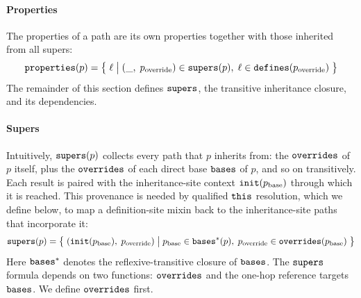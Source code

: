 \paragraph{Properties}
The properties of a path are its own properties together with
those inherited from all supers:
\begin{equation}\label{eq:properties}
  \mathtt{properties}(p) =
  \bigl\{\; \ell \;\big|\;
    (\_,\; p_{\mathrm{override}}) \in \mathtt{supers}(p),\;
    \ell \in \mathtt{defines}(p_{\mathrm{override}})
  \;\bigr\}
\end{equation}
The remainder of this section defines $\mathtt{supers}$,
the transitive inheritance closure,
and its dependencies.

\paragraph{Supers}
Intuitively, $\mathtt{supers}(p)$ collects every path that $p$ inherits from:
the $\mathtt{overrides}$ of $p$ itself,
plus the $\mathtt{overrides}$ of each
direct base $\mathtt{bases}$ of $p$, and so on transitively.
Each result is paired with the inheritance-site context
$\mathtt{init}(p_{\mathrm{base}})$ through which it is reached.
This provenance is needed by qualified $\mathtt{this}$ resolution,
which we define below, to map a definition-site mixin back to
the inheritance-site paths that incorporate it:
\begin{equation}\label{eq:supers}
  \mathtt{supers}(p) =
  \bigl\{\; (\mathtt{init}(p_{\mathrm{base}}),\; p_{\mathrm{override}}) \;\big|\;
    p_{\mathrm{base}} \in \mathtt{bases}^*(p),\;
    p_{\mathrm{override}} \in \mathtt{overrides}(p_{\mathrm{base}})
  \;\bigr\}
\end{equation}
Here $\mathtt{bases}^*$ denotes the reflexive-transitive closure of $\mathtt{bases}$.
The $\mathtt{supers}$ formula depends on two functions:
$\mathtt{overrides}$ and the one-hop reference targets $\mathtt{bases}$.
We define $\mathtt{overrides}$ first.

